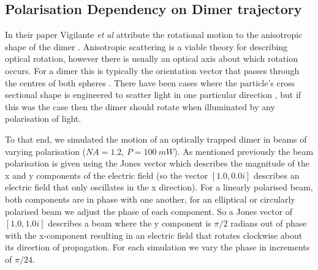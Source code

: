 \subsection{Polarisation Dependency on Dimer trajectory}
\label{sec:rot_pol}
In their paper Vigilante \textit{et al} attribute the 
rotational motion to the anisotropic shape of the dimer
\cite{Vigilante2020}. Anisotropic scattering is a viable 
theory for describing optical rotation, however there is 
usually an optical axis about which rotation occurs. For 
a dimer this is typically the orientation vector that 
passes through the centres of both spheres \cite{Ahn2018, 
Reimann2018, Bruce2020}. There have been cases where the 
particle's cross sectional shape is engineered to scatter
light in one particular direction \cite{Higurashi1994}, 
but if this was the case then the dimer should rotate 
when illuminated by any polarisation of light. 

To that end, we simulated the motion of an optically 
trapped dimer in beams of varying polarisation ($NA=1.2$, 
$P=100\ mW$). As mentioned previously the beam polarisation
is given using the Jones vector which describes the magnitude
of the x and y components of the electric field (so the vector
$[1.0, 0.0i]$ describes an electric field that only oscillates
in the x direction). For a linearly polarised beam, both 
components are in phase with one another, for an elliptical or
circularly polarised beam we adjust the phase of each component. 
So a Jones vector of $[1.0, 1.0i]$ describes a beam where the
y component is $\pi/2$ radians out of phase with the x-component 
resulting in an electric field that rotates clockwise about
its direction of propagation. For each simulation we vary
the phase in increments of $\pi/24$.


